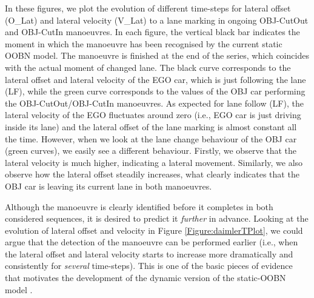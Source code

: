 In these figures, we plot the evolution of different time-steps for lateral offset (O\_Lat) and lateral velocity (V\_Lat) to a lane marking in ongoing OBJ-CutOut and OBJ-CutIn manoeuvres. In each figure, the vertical black bar indicates the moment in which the manoeuvre has been recognised by the current static OOBN model. The manoeuvre is finished at the end of the series, which coincides with the actual moment of changed lane. The black curve corresponds to the lateral offset and lateral velocity of the EGO car, which is just following the lane (LF), while the green curve corresponds to the values of the OBJ car performing the OBJ-CutOut/OBJ-CutIn manoeuvres. As expected for lane follow (LF), the lateral velocity of the EGO fluctuates around zero (i.e., EGO car is just driving inside its lane) and the lateral offset of the lane marking is almost constant all the time. However, when we look at the lane change behaviour of the OBJ car (green curves), we easily see a different behaviour. Firstly, we observe that the lateral velocity is much  higher, indicating a lateral movement. Similarly, we also observe how the lateral offset steadily increases, what clearly indicates that the OBJ car is leaving its current lane in both manoeuvres. 


Although the manoeuvre is clearly identified before it completes in both considered sequences, it is desired to predict it \textit{further} in advance. Looking at the evolution of lateral offset and velocity in Figure \ref{Figure:daimlerTPlot}, we could argue that the detection of the manoeuvre can be performed earlier (i.e., when the lateral offset and lateral velocity starts to increase more dramatically and consistently for \textit{several} time-steps). This is one of the basic pieces of evidence that motivates the development of the dynamic version of the static-OOBN model \cite{Weidl2014}. 



